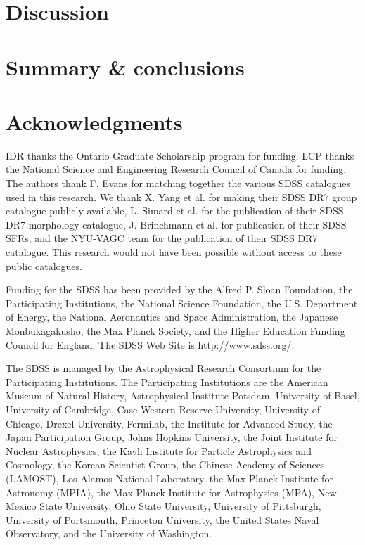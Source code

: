 \documentclass[a4paper,fleqn,usenatbib]{mnras}
\begin{document}

\section{Discussion}
\label{sec:discussion}


\section{Summary \& conclusions}
\label{sec:summary} 


\section*{Acknowledgments}
\label{sec:acknowledgments}

IDR thanks the Ontario Graduate Scholarship program for funding.  LCP
thanks the National Science and Engineering Research
Council of Canada for funding.  The authors thank
F. Evans for matching together the various SDSS catalogues used in
this research.  We thank X. Yang et al. for
making their
SDSS DR7 group catalogue publicly available, L. Simard et al. for the
publication of their SDSS DR7 morphology catalogue, J. Brinchmann et al. for
publication of their SDSS SFRs, and the NYU-VAGC
team for the 
publication of their SDSS DR7 catalogue.  This research would not have
been possible without access to these public catalogues.
\par
Funding for the SDSS has been provided by the Alfred P. Sloan
Foundation, the Participating Institutions, the National Science
Foundation, the U.S. Department of Energy, the National Aeronautics
and Space Administration, the Japanese Monbukagakusho, the Max Planck
Society, and the Higher Education Funding Council for England. The
SDSS Web Site is http://www.sdss.org/.
\par
The SDSS is managed by the Astrophysical Research Consortium for the
Participating Institutions. The Participating Institutions are the
American Museum of Natural History, Astrophysical Institute Potsdam,
University of Basel, University of Cambridge, Case Western Reserve
University, University of Chicago, Drexel University, Fermilab, the
Institute for Advanced Study, the Japan Participation Group, Johns
Hopkins University, the Joint Institute for Nuclear Astrophysics, the
Kavli Institute for Particle Astrophysics and Cosmology, the Korean
Scientist Group, the Chinese Academy of Sciences (LAMOST), Los Alamos
National Laboratory, the Max-Planck-Institute for Astronomy (MPIA),
the Max-Planck-Institute for Astrophysics (MPA), New Mexico State
University, Ohio State University, University of Pittsburgh,
University of Portsmouth, Princeton University, the United States
Naval Observatory, and the University of Washington.
\end{document}
